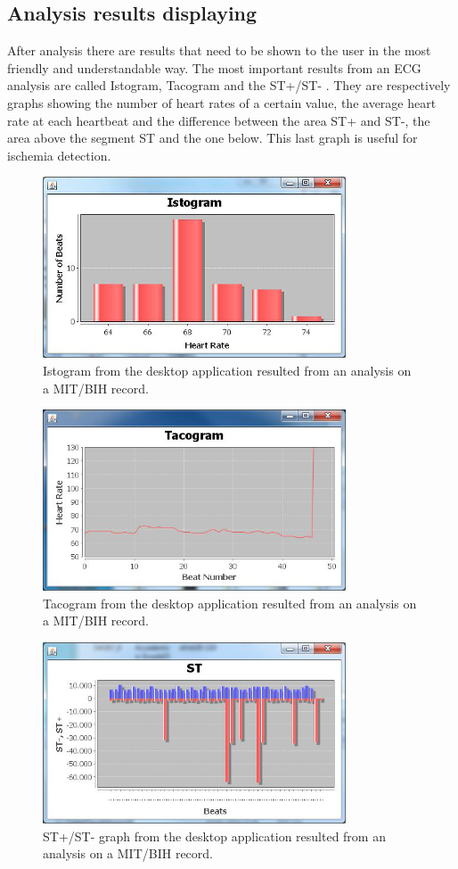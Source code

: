 \subsection{Analysis results displaying}
After analysis there are results that need to be shown to the user in the most friendly and understandable way. The most important results from an ECG analysis are called Istogram, Tacogram and the ST+/ST- . They are respectively graphs showing the number of heart rates of a certain value, the average heart rate at each heartbeat and the difference between the area ST+ and ST-, the area above the segment ST and the one below. This last graph is useful for ischemia detection.\cite{ref4}
\begin{figure}[ht!]
	\centering
	\includegraphics[width=90mm]{figures/ch5/1.png}
	\caption{Istogram from the desktop application resulted from an analysis on a MIT/BIH record.}
	\label{fig5.1}
\end{figure}
\begin{figure}[ht!]
	\centering
	\includegraphics[width=90mm]{figures/ch5/2.png}
	\caption{Tacogram from the desktop application resulted from an analysis on a MIT/BIH record.}
	\label{fig5.2}
\end{figure}
\begin{figure}[ht!]
	\centering
	\includegraphics[width=90mm]{figures/ch5/3.png}
	\caption{ST+/ST- graph from the desktop application resulted from an analysis on a MIT/BIH record.}
	\label{fig5.3}
\end{figure}

